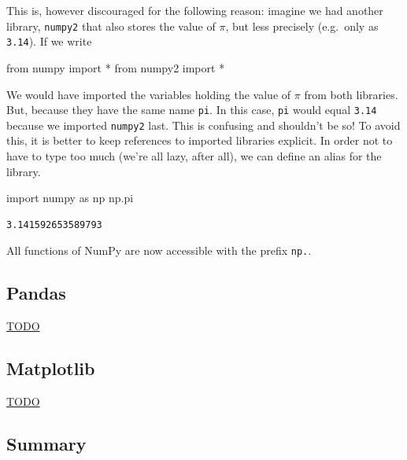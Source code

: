 \documentclass[
  a4paperpaper,
  ,captions=tableheading
]{scrbook}
\newenvironment{Shaded}{\begin{snugshade}}{\end{snugshade}}
\newcommand{\ImportTok}[1]{\textcolor[rgb]{0.00,0.46,0.62}{#1}}
\newcommand{\NormalTok}[1]{\textcolor[rgb]{0.00,0.23,0.31}{#1}}
\newcommand{\OperatorTok}[1]{\textcolor[rgb]{0.37,0.37,0.37}{#1}}
\begin{document}
This is, however discouraged for the following reason: imagine we had
another library, \texttt{numpy2} that also stores the value of \(\pi\),
but less precisely (e.g.~only as \texttt{3.14}). If we write

\begin{Shaded}
\begin{Highlighting}[]
\ImportTok{from}\NormalTok{ numpy }\ImportTok{import} \OperatorTok{*} 
\ImportTok{from}\NormalTok{ numpy2 }\ImportTok{import} \OperatorTok{*} 
\end{Highlighting}
\end{Shaded}

We would have imported the variables holding the value of \(\pi\) from
both libraries. But, because they have the same name \texttt{pi}. In
this case, \texttt{pi} would equal \texttt{3.14} because we imported
\texttt{numpy2} last. This is confusing and shouldn't be so! To avoid
this, it is better to keep references to imported libraries explicit. In
order not to have to type too much (we're all lazy, after all), we can
define an alias for the library.

\begin{Shaded}
\begin{Highlighting}[]
\ImportTok{import}\NormalTok{ numpy }\ImportTok{as}\NormalTok{ np}
\NormalTok{np.pi}
\end{Highlighting}
\end{Shaded}

\begin{verbatim}
3.141592653589793
\end{verbatim}

All functions of NumPy are now accessible with the prefix \texttt{np.}.

\hypertarget{pandas}{%
\subsection{Pandas}\label{pandas}}

\protect\hyperlink{todo}{TODO}

\hypertarget{matplotlib}{%
\subsection{Matplotlib}\label{matplotlib}}

\protect\hyperlink{todo}{TODO}

\hypertarget{summary}{%
\subsection{Summary}\label{summary}}
\end{document}
